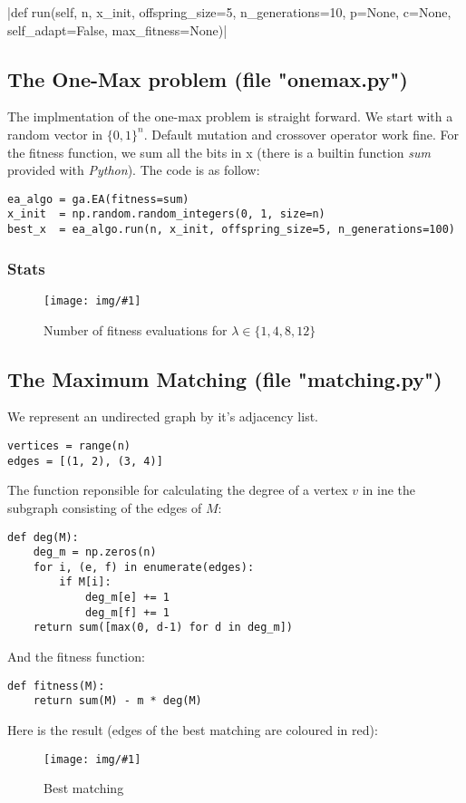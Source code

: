 \documentclass{article}
\newcommand{\IMG}[3]{
\begin{figure}[H]
\centering
\texttt{[image: img/\#1]}%
\caption{#2}%
\label{#1}%
\end{figure}

}
\newcommand{\Stats}{\subsubsection{Stats}}
\begin{document}
|def run(self, n, x_init, offspring_size=5, n_generations=10, p=None, c=None, self_adapt=False, max_fitness=None)|

\subsection{The One-Max problem  (file "onemax.py")}
The implmentation of the one-max problem is straight forward. 
We start with a random vector in $\{0, 1\}^n$. Default mutation and crossover operator work fine. 
For the fitness function, we sum all the bits in x (there is a builtin function \textit{sum} provided with \textit{Python}). The code is as follow:
\begin{verbatim}
ea_algo = ga.EA(fitness=sum)
x_init 	= np.random.random_integers(0, 1, size=n)
best_x 	= ea_algo.run(n, x_init, offspring_size=5, n_generations=100)
\end{verbatim}

\Stats

\IMG{stat_onemax_1.png}{Number of fitness evaluations for $\lambda \in \{1, 4, 8, 12\}$}{0.25}



\subsection{The Maximum Matching  (file "matching.py")}
We represent an undirected graph by it's adjacency list. 
\begin{verbatim}
vertices = range(n)
edges = [(1, 2), (3, 4)]
\end{verbatim}

The function reponsible for calculating the degree of a vertex $v$ in ine the subgraph consisting of the edges of $M$:
\begin{verbatim}
def deg(M):
    deg_m = np.zeros(n)
    for i, (e, f) in enumerate(edges):
        if M[i]:
            deg_m[e] += 1
            deg_m[f] += 1
    return sum([max(0, d-1) for d in deg_m])
\end{verbatim}

And the fitness function:

\begin{verbatim}
def fitness(M): 
    return sum(M) - m * deg(M)
\end{verbatim}

Here is the result (edges of the best matching are coloured in red):\\
\IMG{max_graph.png}{Best matching}{0.25}
\end{document}
